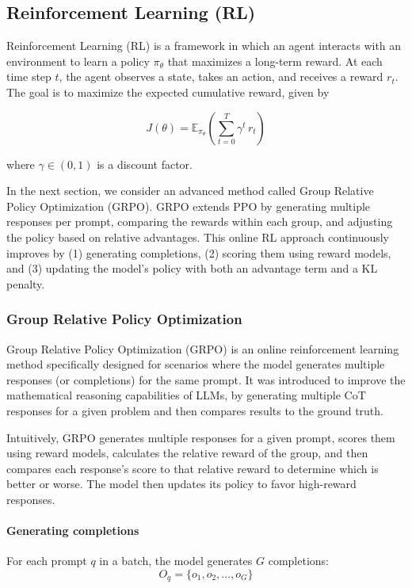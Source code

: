 \subsection{Reinforcement Learning (RL)} \label{app:rl}

Reinforcement Learning (RL) is a framework in which an agent interacts with an environment to learn a policy $\pi_\theta$ that maximizes a long-term reward. At each time step $t$, the agent observes a state, takes an action, and receives a reward $r_t$. The goal is to maximize the expected cumulative reward, given by

\begin{equation}
J(\theta) = \mathbb{E}_{\pi_\theta}\left( \sum_{t=0}^{T} \gamma^t\,r_t\right)
\end{equation}

where $\gamma\in(0,1)$ is a discount factor.

In the next section, we consider an advanced method called Group Relative Policy Optimization (GRPO). GRPO extends PPO by generating multiple responses per prompt, comparing the rewards within each group, and adjusting the policy based on relative advantages. This online RL approach continuously improves by (1) generating completions, (2) scoring them using reward models, and (3) updating the model's policy with both an advantage term and a KL penalty.

\subsubsection{Group Relative Policy Optimization} \label{app:grpo}

Group Relative Policy Optimization (GRPO) \citet{DeepSeek-AIDEEPSEEKR12025} is an online reinforcement learning method specifically designed for scenarios where the model generates multiple responses (or completions) for the same prompt. It was introduced to improve the mathematical reasoning capabilities of LLMs, by generating multiple CoT responses for a given problem and then compares results to the ground truth.

Intuitively, GRPO generates multiple responses for a given prompt, scores them using reward models, calculates the relative reward of the group, and then compares each response's score to that relative reward to determine which is better or worse. The model then updates its policy to favor high-reward responses.

\paragraph{Generating completions} For each prompt $q$ in a batch, the model generates $G$ completions:
\begin{equation}
O_q = \{o_1, o_2, \ldots, o_G\}
\end{equation}


